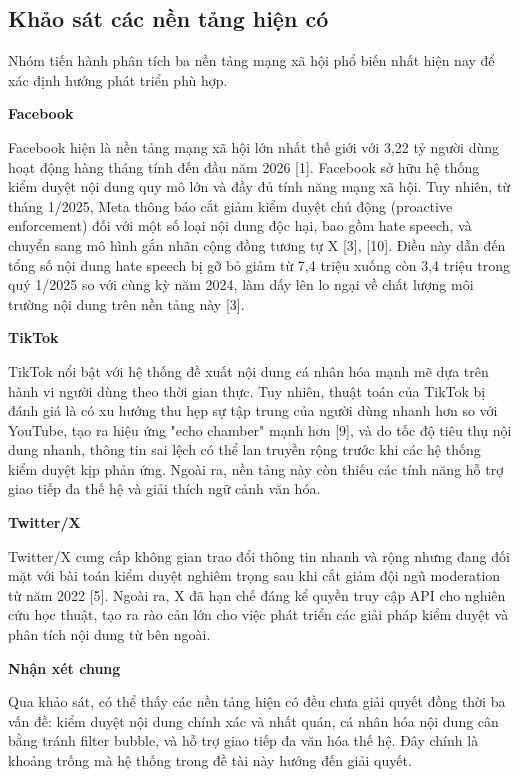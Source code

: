 \subsection{\texorpdfstring{Khảo sát các nền tảng hiện có
}{Khảo sát các nền tảng hiện có }}\label{khux1ea3o-suxe1t-cuxe1c-nux1ec1n-tux1ea3ng-hiux1ec7n-cuxf3}

Nhóm tiến hành phân tích ba nền tảng mạng xã hội phổ biến nhất hiện nay
để xác định hướng phát triển phù hợp.

\textbf{Facebook}

Facebook hiện là nền tảng mạng xã hội lớn nhất thế giới với 3,22 tỷ
người dùng hoạt động hàng tháng tính đến đầu năm 2026 {[}1{]}. Facebook
sở hữu hệ thống kiểm duyệt nội dung quy mô lớn và đầy đủ tính năng mạng
xã hội. Tuy nhiên, từ tháng 1/2025, Meta thông báo cắt giảm kiểm duyệt
chủ động (proactive enforcement) đối với một số loại nội dung độc hại,
bao gồm hate speech, và chuyển sang mô hình gắn nhãn cộng đồng tương tự
X {[}3{]}, {[}10{]}. Điều này dẫn đến tổng số nội dung hate speech bị gỡ
bỏ giảm từ 7,4 triệu xuống còn 3,4 triệu trong quý 1/2025 so với cùng kỳ
năm 2024, làm dấy lên lo ngại về chất lượng môi trường nội dung trên nền
tảng này {[}3{]}.

\textbf{TikTok}

TikTok nổi bật với hệ thống đề xuất nội dung cá nhân hóa mạnh mẽ dựa
trên hành vi người dùng theo thời gian thực. Tuy nhiên, thuật toán của
TikTok bị đánh giá là có xu hướng thu hẹp sự tập trung của người dùng
nhanh hơn so với YouTube, tạo ra hiệu ứng "echo chamber" mạnh hơn
{[}9{]}, và do tốc độ tiêu thụ nội dung nhanh, thông tin sai lệch có thể
lan truyền rộng trước khi các hệ thống kiểm duyệt kịp phản ứng. Ngoài
ra, nền tảng này còn thiếu các tính năng hỗ trợ giao tiếp đa thế hệ và
giải thích ngữ cảnh văn hóa.

\textbf{Twitter/X}

Twitter/X cung cấp không gian trao đổi thông tin nhanh và rộng nhưng
đang đối mặt với bài toán kiểm duyệt nghiêm trọng sau khi cắt giảm đội
ngũ moderation từ năm 2022 {[}5{]}. Ngoài ra, X đã hạn chế đáng kể quyền
truy cập API cho nghiên cứu học thuật, tạo ra rào cản lớn cho việc phát
triển các giải pháp kiểm duyệt và phân tích nội dung từ bên ngoài.

\textbf{Nhận xét chung}

Qua khảo sát, có thể thấy các nền tảng hiện có đều chưa giải quyết đồng
thời ba vấn đề: kiểm duyệt nội dung chính xác và nhất quán, cá nhân hóa
nội dung cân bằng tránh filter bubble, và hỗ trợ giao tiếp đa văn hóa
thế hệ. Đây chính là khoảng trống mà hệ thống trong đề tài này hướng đến
giải quyết.

